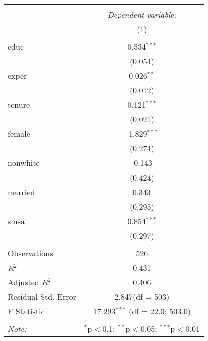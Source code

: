 \begin{table}[!htbp] \centering
\begin{tabular}{@{\extracolsep{5pt}}lc}
\\[-1.8ex]\hline
\hline \\[-1.8ex]
& \multicolumn{1}{c}{\textit{Dependent variable:}} \
\cr \cline{1-2}
\\[-1.8ex] & (1) \\
\hline \\[-1.8ex]
 educ & 0.534$^{***}$ \\
  & (0.054) \\
 exper & 0.026$^{**}$ \\
  & (0.012) \\
 tenure & 0.121$^{***}$ \\
  & (0.021) \\
 female & -1.829$^{***}$ \\
  & (0.274) \\
 nonwhite & -0.143$^{}$ \\
  & (0.424) \\
 married & 0.343$^{}$ \\
  & (0.295) \\
 smsa & 0.854$^{***}$ \\
  & (0.297) \\
\hline \\[-1.8ex]
 Observations & 526 \\
 $R^2$ & 0.431 \\
 Adjusted $R^2$ & 0.406 \\
 Residual Std. Error & 2.847(df = 503)  \\
 F Statistic & 17.293$^{***}$ (df = 22.0; 503.0) \\
\hline
\hline \\[-1.8ex]
\textit{Note:} & \multicolumn{1}{r}{$^{*}$p$<$0.1; $^{**}$p$<$0.05; $^{***}$p$<$0.01} \\
\end{tabular}
\end{table}